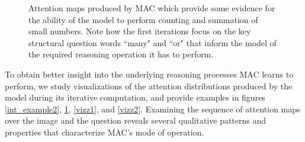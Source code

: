 \documentclass[fleqn]{article}
\begin{document}
\begin{figure}[t]
\vspace*{-15mm}
\centering
\begin{minipage}{0.18\textwidth}
\vspace*{4mm}
\end{minipage}
\begin{minipage}{0.7\textwidth}
\noindent
\centering
{}
\hfill
{}
\hfill
{}
\vspace*{-2.5mm}
\hfill
{}
\hfill
{}
\end{minipage}

\vspace*{-4mm}

\scriptsize 

\caption{Attention maps produced by MAC which provide some evidence for the ability of the model to perform counting and summation of small numbers. Note how the first iterations focus on the key structural question words ``many" and ``or" that inform the model of the required reasoning operation it has to perform.}
\label{intr}

\end{figure}

To obtain better insight into the underlying reasoning processes MAC learns to perform, we study visualizations of the attention distributions produced by the model during its iterative computation, and provide examples in figures \ref{int_example2}, \ref{intr}, \ref{vizz1}, and \ref{vizz2}. Examining the sequence of attention maps over the image and the question reveals several qualitative patterns and properties that characterize MAC's mode of operation. 
\end{document}

